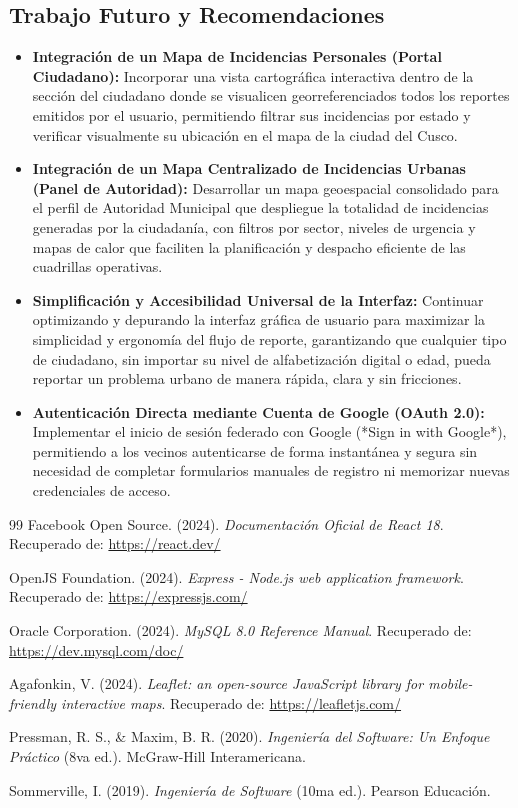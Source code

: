 \documentclass[12pt,a4paper]{article}
\begin{document}
\subsection{Trabajo Futuro y Recomendaciones}
\begin{itemize}[leftmargin=*]
    \item \textbf{Integración de un Mapa de Incidencias Personales (Portal Ciudadano):} Incorporar una vista cartográfica interactiva dentro de la sección del ciudadano donde se visualicen georreferenciados todos los reportes emitidos por el usuario, permitiendo filtrar sus incidencias por estado y verificar visualmente su ubicación en el mapa de la ciudad del Cusco.
    \item \textbf{Integración de un Mapa Centralizado de Incidencias Urbanas (Panel de Autoridad):} Desarrollar un mapa geoespacial consolidado para el perfil de Autoridad Municipal que despliegue la totalidad de incidencias generadas por la ciudadanía, con filtros por sector, niveles de urgencia y mapas de calor que faciliten la planificación y despacho eficiente de las cuadrillas operativas.
    \item \textbf{Simplificación y Accesibilidad Universal de la Interfaz:} Continuar optimizando y depurando la interfaz gráfica de usuario para maximizar la simplicidad y ergonomía del flujo de reporte, garantizando que cualquier tipo de ciudadano, sin importar su nivel de alfabetización digital o edad, pueda reportar un problema urbano de manera rápida, clara y sin fricciones.
    \item \textbf{Autenticación Directa mediante Cuenta de Google (OAuth 2.0):} Implementar el inicio de sesión federado con Google (*Sign in with Google*), permitiendo a los vecinos autenticarse de forma instantánea y segura sin necesidad de completar formularios manuales de registro ni memorizar nuevas credenciales de acceso.
\end{itemize}

\newpage
\begin{thebibliography}{99}
Facebook Open Source. (2024). \textit{Documentación Oficial de React 18}. Recuperado de: \url{https://react.dev/}

OpenJS Foundation. (2024). \textit{Express - Node.js web application framework}. Recuperado de: \url{https://expressjs.com/}

Oracle Corporation. (2024). \textit{MySQL 8.0 Reference Manual}. Recuperado de: \url{https://dev.mysql.com/doc/}

Agafonkin, V. (2024). \textit{Leaflet: an open-source JavaScript library for mobile-friendly interactive maps}. Recuperado de: \url{https://leafletjs.com/}

Pressman, R. S., \& Maxim, B. R. (2020). \textit{Ingeniería del Software: Un Enfoque Práctico} (8va ed.). McGraw-Hill Interamericana.

Sommerville, I. (2019). \textit{Ingeniería de Software} (10ma ed.). Pearson Educación.
\end{thebibliography}
\end{document}
